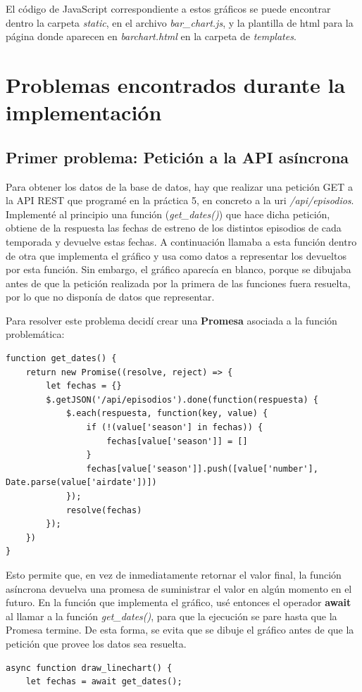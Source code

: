 \documentclass[12pt]{article}
\begin{document}
  El código de JavaScript correspondiente a estos gráficos se puede encontrar dentro la carpeta \textit{static}, en el archivo \textit{bar\_chart.js}, y la plantilla de html para la página donde aparecen en \textit{barchart.html} en la carpeta de \textit{templates}.

\section{Problemas encontrados durante la implementación}
\subsection{Primer problema: Petición a la API asíncrona}
Para obtener los datos de la base de datos, hay que realizar una petición GET a la API REST que programé en la práctica 5, en concreto a la uri \textit{/api/episodios}. Implementé al principio una función (\textit{get\_dates()}) que hace dicha petición, obtiene de la respuesta las fechas de estreno de los distintos episodios de cada temporada y devuelve estas fechas. A continuación llamaba a esta función dentro de otra que implementa el gráfico y usa como datos a representar los devueltos por esta función. Sin embargo, el gráfico aparecía en blanco, porque se dibujaba antes de que la petición realizada por la primera de las funciones fuera resuelta, por lo que no disponía de datos que representar. 

Para resolver este problema decidí crear una \textbf{Promesa} asociada a la función problemática: 
\begin{lstlisting}
function get_dates() {
	return new Promise((resolve, reject) => {
		let fechas = {}
		$.getJSON('/api/episodios').done(function(respuesta) {
			$.each(respuesta, function(key, value) {
				if (!(value['season'] in fechas)) {
					fechas[value['season']] = []
				}
				fechas[value['season']].push([value['number'], Date.parse(value['airdate'])])
			});
			resolve(fechas)
		});
	})
}
\end{lstlisting}

 Esto permite que, en vez de inmediatamente retornar el valor final, la función asíncrona devuelva una promesa de suministrar el valor en algún momento en el futuro. En la función que implementa el gráfico, usé entonces el operador \textbf{await} al llamar a la función \textit{get\_dates()}, para que la ejecución se pare hasta que la Promesa termine. De esta forma, se evita que se dibuje el gráfico antes de que la petición que provee los datos sea resuelta.
 \begin{lstlisting}
async function draw_linechart() {
	let fechas = await get_dates();
 \end{lstlisting}
 
\end{document}
